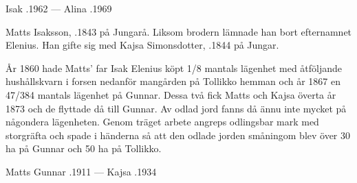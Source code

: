 Isak .1962  ---  Alina .1969


Matts Isaksson, .1843 på Jungarå. Liksom brodern lämnade han bort efternamnet Elenius. Han gifte sig med Kajsa Simonsdotter,	.1844 på Jungar.
\begin{jhchildren}
  \item {}
  \item {}
  \item {}
  \item {}
  \item {}
  \item {}
  \item {}
  \item {}
\end{jhchildren}

År 1860 hade Matts' far Isak Elenius köpt 1/8 mantals lägenhet med åtföljande hushållskvarn i forsen nedanför mangården på Tollikko hemman och år 1867 en 47/384 mantals lägenhet på Gunnar. Dessa två fick Matts och Kajsa överta år 1873 och de flyttade då till Gunnar. Av odlad jord fanns då ännu inte mycket på någondera lägenheten. Genom träget arbete angreps odlingsbar mark med storgräfta och spade i händerna så att den odlade jorden småningom blev över 30 ha på Gunnar och 50 ha på Tollikko.

Matts Gunnar .1911  ---  Kajsa .1934


